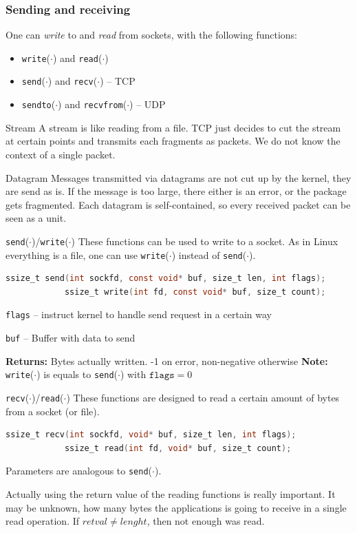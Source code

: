 \documentclass[english]{panikzettel}
\newcommand{\fkt}[1]{\texttt{#1}(\(\cdot\))}
\begin{document}
	\subsubsection{Sending and receiving}
	
	One can \textit{write} to and \textit{read} from sockets, with the following functions:
	\begin{itemize}
		\item \fkt{write} and \fkt{read}
		\item \fkt{send} and \fkt{recv} – TCP
		\item \fkt{sendto} and \fkt{recvfrom} – UDP
	\end{itemize}
	
	\begin{defi}{Stream}
		A stream is like reading from a file. TCP just decides to cut the stream at certain points and transmits each fragments as packets.
		We do not know the context of a single packet.
	\end{defi}

	\begin{defi}{Datagram}
		Messages transmitted via datagrams are not cut up by the kernel, they are send as is. If the message is too large, there either is an error, or the package gets fragmented. 
		Each datagram is self-contained, so every received packet can be seen as a unit. 
 	\end{defi}

	\begin{defi}{\fkt{send}/\fkt{write}}
		These functions can be used to write to a socket. 
		As in Linux everything is a file, one can use \fkt{write} instead of \fkt{send}.
		\begin{lstlisting}[language=C]
			ssize_t send(int sockfd, const void* buf, size_t len, int flags);
			ssize_t write(int fd, const void* buf, size_t count);
		\end{lstlisting}
		\tcblower
		\texttt{flags} – instruct kernel to handle send request in a certain way

		\texttt{buf} – Buffer with data to send

		\textbf{Returns:} Bytes actually written. -1 on error, non-negative otherwise 
		\textbf{Note:} \fkt{write} is equals to \fkt{send} with \( \texttt{flags} = 0\)
	\end{defi}

	\begin{defi}{\fkt{recv}/\fkt{read}}
		These functions are designed to read a certain amount of bytes from a socket (or file).
		\begin{lstlisting}[language=C]
			ssize_t recv(int sockfd, void* buf, size_t len, int flags);
			ssize_t read(int fd, void* buf, size_t count);
		\end{lstlisting}
		\tcblower
		Parameters are analogous to \fkt{send}.
	\end{defi}
	Actually using the return value of the reading functions is really important.
	It may be unknown, how many bytes the applications is going to receive in a single read operation.
	If \( retval \not= lenght \), then not enough was read. 
\end{document}
